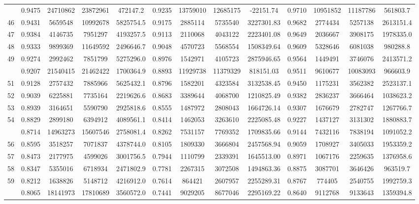 \documentclass[
  12pt,
]{article}
\begin{document}
\begin{longtable}[t]{lcccccccccccc}
\addlinespace
45 & 0.9475 & 24710862 & 23872961 & 472147.2 & 0.9235 & 13759010 & 12685175 & -22151.74 & 0.9710 & 10951852 & 11187786 & 561803.7\\
46 & 0.9431 & 5659548 & 10992678 & 5825754.5 & 0.9175 & 2885114 & 5735540 & 3227301.83 & 0.9682 & 2774434 & 5257138 & 2613151.4\\
47 & 0.9384 & 4146735 & 7951297 & 4193257.5 & 0.9113 & 2110068 & 4043122 & 2223401.08 & 0.9649 & 2036667 & 3908175 & 1978335.0\\
48 & 0.9333 & 9899369 & 11649592 & 2496646.7 & 0.9048 & 4570723 & 5568554 & 1508349.64 & 0.9609 & 5328646 & 6081038 & 980288.8\\
49 & 0.9274 & 2992462 & 7851799 & 5275296.0 & 0.8976 & 1542971 & 4105723 & 2875946.65 & 0.9564 & 1449491 & 3746076 & 2413571.2\\
\addlinespace
50 & 0.9207 & 21540415 & 21462422 & 1700364.9 & 0.8893 & 11929738 & 11379329 & 818151.03 & 0.9511 & 9610677 & 10083093 & 966603.9\\
51 & 0.9128 & 2757432 & 7885966 & 5625432.1 & 0.8796 & 1582201 & 4323584 & 3132538.45 & 0.9450 & 1175231 & 3562382 & 2523137.1\\
52 & 0.9039 & 6225881 & 7735164 & 2219626.6 & 0.8683 & 3389644 & 4068700 & 1210825.49 & 0.9382 & 2836237 & 3666464 & 1038623.2\\
53 & 0.8939 & 3164651 & 5590790 & 2925818.6 & 0.8555 & 1487972 & 2808043 & 1664726.14 & 0.9307 & 1676679 & 2782747 & 1267766.7\\
54 & 0.8829 & 2899180 & 6394912 & 4089561.1 & 0.8414 & 1462053 & 3263610 & 2225085.48 & 0.9227 & 1437127 & 3131302 & 1880883.7\\
\addlinespace
55 & 0.8714 & 14963273 & 15607546 & 2758081.4 & 0.8262 & 7531157 & 7769352 & 1709835.66 & 0.9144 & 7432116 & 7838194 & 1091052.2\\
56 & 0.8595 & 3518257 & 7071837 & 4378744.0 & 0.8105 & 1809330 & 3666804 & 2457568.94 & 0.9059 & 1708927 & 3405033 & 1953359.2\\
57 & 0.8473 & 2177975 & 4599026 & 3001756.5 & 0.7944 & 1110799 & 2339391 & 1645513.00 & 0.8971 & 1067176 & 2259635 & 1376958.6\\
58 & 0.8347 & 5355016 & 6718934 & 2471802.9 & 0.7781 & 2267315 & 3072508 & 1494863.36 & 0.8875 & 3087701 & 3646426 & 963519.7\\
59 & 0.8212 & 1638826 & 5148712 & 4216912.0 & 0.7614 & 864421 & 2607957 & 2255289.31 & 0.8767 & 774405 & 2540755 & 1992759.3\\
\addlinespace
60 & 0.8065 & 18141973 & 17810689 & 3560572.0 & 0.7441 & 9029205 & 8677046 & 2295169.22 & 0.8640 & 9112768 & 9133643 & 1359394.8\\

\end{longtable}
\end{document}

